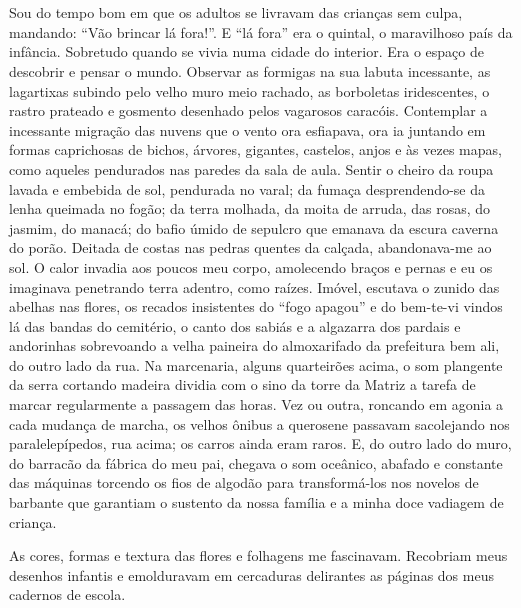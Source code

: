 \chapter{}
Sou do tempo bom em que os adultos se livravam das crianças sem culpa, mandando: ``Vão brincar lá fora!''.
E ``lá fora'' era o quintal, o maravilhoso país da infância.
Sobretudo quando se vivia numa cidade do interior. 
Era o espaço de descobrir e pensar o mundo. 
Observar as formigas na sua labuta incessante, as lagartixas subindo pelo velho muro meio rachado, as borboletas iridescentes, o rastro prateado e gosmento desenhado pelos vagarosos caracóis.   
Contemplar a incessante migração das nuvens que o vento ora esfiapava, ora ia juntando em formas caprichosas de bichos, árvores, gigantes, castelos, anjos e às vezes mapas, como aqueles pendurados nas paredes da sala de aula. 
Sentir o cheiro da roupa lavada e embebida de sol, pendurada no varal; da fumaça desprendendo-se da lenha queimada no fogão; da terra molhada, da moita de arruda, das rosas, do jasmim, do manacá; do bafio úmido de sepulcro que emanava da escura caverna do porão. 
Deitada de costas nas pedras quentes da calçada, abandonava-me ao sol. O calor invadia aos poucos meu corpo, amolecendo braços e pernas e eu os imaginava penetrando terra adentro, como raízes. 
Imóvel, escutava o zunido das abelhas nas flores, os recados insistentes do ``fogo apagou'' e do bem-te-vi vindos lá das bandas do cemitério, o canto dos sabiás e a algazarra dos pardais e andorinhas sobrevoando a velha paineira do almoxarifado da prefeitura bem ali, do outro lado da rua. 
Na marcenaria, alguns quarteirões acima, o som plangente da serra cortando madeira dividia com o sino da torre da Matriz a tarefa de marcar regularmente a passagem das horas. 
Vez ou outra, roncando em agonia a cada mudança de marcha, os velhos ônibus a querosene passavam sacolejando nos paralelepípedos, rua acima; os carros ainda eram raros. 
E, do outro lado do muro, do barracão da fábrica do meu pai, chegava o som oceânico, abafado e constante das máquinas torcendo os fios de algodão para transformá-los nos novelos de barbante que garantiam o sustento da nossa família e a minha doce vadiagem de criança.

As cores, formas e textura das flores e folhagens me fascinavam. 
Recobriam meus desenhos infantis e emolduravam em cercaduras delirantes as páginas dos meus cadernos de escola.


